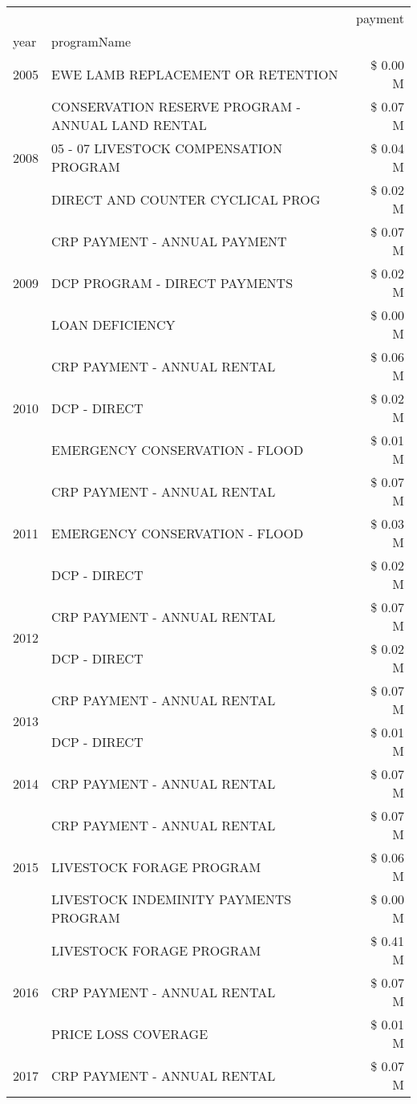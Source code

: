 \begin{tabular}{llr}
\toprule
 &  & payment \\
year & programName &  \\
\midrule
2005 & EWE LAMB REPLACEMENT OR RETENTION & \$ 0.00 M \\
\cline{1-3}
\multirow[t]{3}{*}{2008} & CONSERVATION RESERVE PROGRAM - ANNUAL LAND RENTAL & \$ 0.07 M \\
 & 05 - 07 LIVESTOCK COMPENSATION PROGRAM & \$ 0.04 M \\
 & DIRECT AND COUNTER CYCLICAL PROG & \$ 0.02 M \\
\cline{1-3}
\multirow[t]{3}{*}{2009} & CRP PAYMENT - ANNUAL PAYMENT & \$ 0.07 M \\
 & DCP PROGRAM - DIRECT PAYMENTS & \$ 0.02 M \\
 & LOAN DEFICIENCY & \$ 0.00 M \\
\cline{1-3}
\multirow[t]{3}{*}{2010} & CRP PAYMENT - ANNUAL RENTAL & \$ 0.06 M \\
 & DCP - DIRECT & \$ 0.02 M \\
 & EMERGENCY CONSERVATION - FLOOD & \$ 0.01 M \\
\cline{1-3}
\multirow[t]{3}{*}{2011} & CRP PAYMENT - ANNUAL RENTAL & \$ 0.07 M \\
 & EMERGENCY CONSERVATION - FLOOD & \$ 0.03 M \\
 & DCP - DIRECT & \$ 0.02 M \\
\cline{1-3}
\multirow[t]{2}{*}{2012} & CRP PAYMENT - ANNUAL RENTAL & \$ 0.07 M \\
 & DCP - DIRECT & \$ 0.02 M \\
\cline{1-3}
\multirow[t]{2}{*}{2013} & CRP PAYMENT - ANNUAL RENTAL & \$ 0.07 M \\
 & DCP - DIRECT & \$ 0.01 M \\
\cline{1-3}
2014 & CRP PAYMENT - ANNUAL RENTAL & \$ 0.07 M \\
\cline{1-3}
\multirow[t]{3}{*}{2015} & CRP PAYMENT - ANNUAL RENTAL & \$ 0.07 M \\
 & LIVESTOCK FORAGE PROGRAM & \$ 0.06 M \\
 & LIVESTOCK INDEMINITY PAYMENTS PROGRAM & \$ 0.00 M \\
\cline{1-3}
\multirow[t]{3}{*}{2016} & LIVESTOCK FORAGE PROGRAM & \$ 0.41 M \\
 & CRP PAYMENT - ANNUAL RENTAL & \$ 0.07 M \\
 & PRICE LOSS COVERAGE & \$ 0.01 M \\
\cline{1-3}
\multirow[t]{2}{*}{2017} & CRP PAYMENT - ANNUAL RENTAL & \$ 0.07 M \\

\end{tabular}

